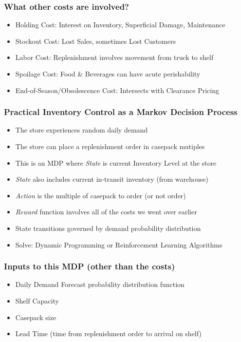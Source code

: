 \documentclass[handout]{beamer}
\begin{document}
\begin{frame}
\frametitle{What other costs are involved?}
\pause
\begin{itemize}[<+->]
\item Holding Cost: Interest on Inventory, Superficial Damage, Maintenance
\item Stockout Cost: Lost Sales, sometimes Lost Customers
\item Labor Cost: Replenishment involves movement from truck to shelf
\item Spoilage Cost: Food \& Beverages can have acute perishability
\item End-of-Season/Obsolescence Cost: Intersects with Clearance Pricing 
\end{itemize}
\end{frame}

\begin{frame}
\frametitle{Practical Inventory Control as a Markov Decision Process}
\pause
\begin{itemize}[<+->]
\item The store experiences random daily demand
\item The store can place a replenishment order in casepack mutiples
\item This is an MDP where {\em State} is current Inventory Level at the store
\item {\em State} also includes current in-transit inventory (from warehouse)
\item {\em Action} is the multiple of casepack to order (or not order)
\item {\em Reward} function involves all of the costs we went over earlier
\item State transitions governed by demand probability distribution
\item Solve: Dynamic Programming or Reinforcement Learning Algorithms
\end{itemize}
\end{frame}

\begin{frame}
\frametitle{Inputs to this MDP (other than the costs)}
\pause
\begin{itemize}[<+->]
\item Daily Demand Forecast probability distribution function
\item Shelf Capacity
\item Casepack size
\item Lead Time (time from replenishment order to arrival on shelf)
\end{itemize}
\end{frame}
\end{document}
